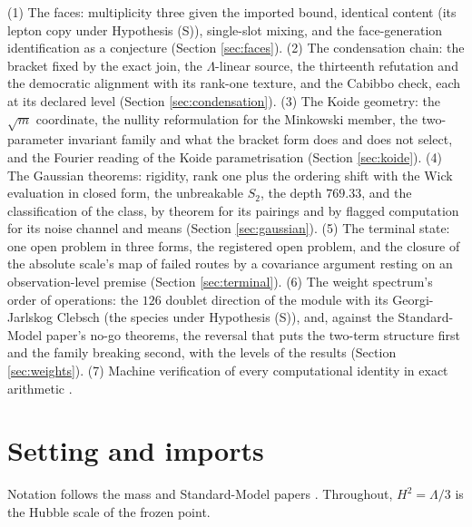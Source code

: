 \documentclass[11pt]{article}
\theoremstyle{definition}
\begin{document}
(1) The faces: multiplicity three given the imported bound, identical content (its lepton copy under Hypothesis (S)), single-slot mixing, and the face-generation identification as a conjecture (Section \ref{sec:faces}). (2) The condensation chain: the bracket fixed by the exact join, the $\Lambda$-linear source, the thirteenth refutation and the democratic alignment with its rank-one texture, and the Cabibbo check, each at its declared level (Section \ref{sec:condensation}). (3) The Koide geometry: the $\sqrt{m}$ coordinate, the nullity reformulation for the Minkowski member, the two-parameter invariant family and what the bracket form does and does not select, and the Fourier reading of the Koide parametrisation (Section \ref{sec:koide}). (4) The Gaussian theorems: rigidity, rank one plus the ordering shift with the Wick evaluation in closed form, the unbreakable $S_{2}$, the depth $769.33$, and the classification of the class, by theorem for its pairings and by flagged computation for its noise channel and means (Section \ref{sec:gaussian}). (5) The terminal state: one open problem in three forms, the registered open problem, and the closure of the absolute scale's map of failed routes by a covariance argument resting on an observation-level premise (Section \ref{sec:terminal}). (6) The weight spectrum's order of operations: the $126$ doublet direction of the module with its Georgi-Jarlskog Clebsch (the species under Hypothesis (S)), and, against the Standard-Model paper's no-go theorems, the reversal that puts the two-term structure first and the family breaking second, with the levels of the results (Section \ref{sec:weights}). (7) Machine verification of every computational identity in exact arithmetic \cite{ButlerVerifyT13}.

\section{Setting and imports}\label{sec:setting}

Notation follows the mass and Standard-Model papers \cite{ButlerT11, ButlerT12}. Throughout, $H^{2} = \Lambda/3$ is the Hubble scale of the frozen point.
\end{document}
